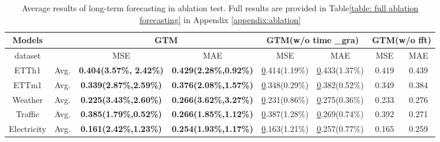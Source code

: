 \begin{table*}[]
\centering
\caption{Average results of long-term forecasting in ablation test. Full results are provided in Table\ref{table: full ablation forecasting} in Appendix \ref{appendix:ablation}}
\label{table:forecasting ablation}
\small %
\setlength{\tabcolsep}{4pt} %
\renewcommand{\arraystretch}{0.8} %
\begin{tabular}{c|c|cc|cc|cc}
\toprule
Models &  & \multicolumn{2}{c|}{\textbf{GTM}} & \multicolumn{2}{c|}{\textbf{GTM(w/o  time \_gra)}} & \multicolumn{2}{c}{\textbf{GTM(w/o  fft)}} \\ \midrule
dataset &  & MSE & MAE & MSE & MAE & MSE & MAE \\ \midrule
ETTh1 & Avg. & \textbf{0.404(3.57\%, 2.42\%)} & \textbf{0.429(2.28\%,0.92\%)} & {\color[HTML]{000000} {\ul 0.414(1.19\%)}} & {\color[HTML]{000000} {\ul 0.433(1.37\%)}} & 0.419 & 0.439 \\
ETTm1 & Avg. & \textbf{0.339(2.87\%,2.59\%)} & \textbf{0.376(2.08\%,1.57\%)} & {\color[HTML]{000000} {\ul 0.348(0.29\%)}} & {\color[HTML]{000000} {\ul 0.382(0.52\%)}} & 0.349 & 0.384 \\
Weather & Avg. & \textbf{0.225(3.43\%,2.60\%)} & \textbf{0.266(3.62\%,3.27\%)} & {\color[HTML]{000000} {\ul 0.231(0.86\%)}} & {\color[HTML]{000000} {\ul 0.275(0.36\%)}} & 0.233 & 0.276 \\
Traffic & Avg. & \textbf{0.385(1.79\%,0.52\%)} & \textbf{0.266(1.85\%,1.12\%)} & {\color[HTML]{000000} {\ul 0.387(1.28\%)}} & {\color[HTML]{000000} {\ul 0.269(0.74\%)}} & 0.392 & 0.271 \\
Electricity & Avg. & \textbf{0.161(2.42\%,1.23\%)} & \textbf{0.254(1.93\%,1.17\%)} & {\color[HTML]{000000} {\ul 0.163(1.21\%)}} & {\color[HTML]{000000} {\ul 0.257(0.77\%)}} & 0.165 & 0.259\\ 
            \bottomrule
\end{tabular}

\end{table*}